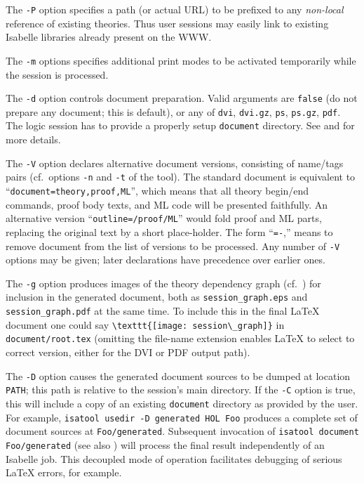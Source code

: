 \begin{isabellebody}
\begin{isamarkuptext}
  The \verb|-P| option specifies a path (or actual URL) to be
  prefixed to any \emph{non-local} reference of existing theories.
  Thus user sessions may easily link to existing Isabelle libraries
  already present on the WWW.

  The \verb|-m| options specifies additional print modes to be
  activated temporarily while the session is processed.

  \medskip The \verb|-d| option controls document preparation.
  Valid arguments are \verb|false| (do not prepare any document;
  this is default), or any of \verb|dvi|, \verb|dvi.gz|,
  \verb|ps|, \verb|ps.gz|, \verb|pdf|.  The logic
  session has to provide a properly setup \verb|document|
  directory.  See  and
   for more details.

  \medskip The \verb|-V| option declares alternative document
  versions, consisting of name/tags pairs (cf.\ options \verb|-n| and \verb|-t| of the \hyperlink{tool.document}{\mbox{}} tool).  The
  standard document is equivalent to ``\verb|document=theory,proof,ML|'', which means that all theory begin/end
  commands, proof body texts, and ML code will be presented
  faithfully.  An alternative version ``\verb|outline=/proof/ML|'' would fold proof and ML parts, replacing the
  original text by a short place-holder.  The form ``\verb|=-|,'' means to remove document  from
  the list of versions to be processed.  Any number of \verb|-V| options may be given; later declarations have precedence over
  earlier ones.

  \medskip The \verb|-g| option produces images of the theory
  dependency graph (cf.\ ) for inclusion in the
  generated document, both as \verb|session_graph.eps| and
  \verb|session_graph.pdf| at the same time.  To include this in
  the final {\LaTeX} document one could say \verb|\texttt{[image: session\_graph]}| in \verb|document/root.tex| (omitting the file-name extension enables
  {\LaTeX} to select to correct version, either for the DVI or PDF
  output path).

  \medskip The \verb|-D| option causes the generated document
  sources to be dumped at location \verb|PATH|; this path is
  relative to the session's main directory.  If the \verb|-C|
  option is true, this will include a copy of an existing \verb|document| directory as provided by the user.  For example,
  \verb|isatool usedir -D generated HOL Foo| produces a
  complete set of document sources at \verb|Foo/generated|.
  Subsequent invocation of \verb|isatool document|\isasep\isanewline%
\verb|  Foo/generated| (see also ) will process
  the final result independently of an Isabelle job.  This decoupled
  mode of operation facilitates debugging of serious {\LaTeX} errors,
  for example.


\end{isamarkuptext}
\end{isabellebody}
